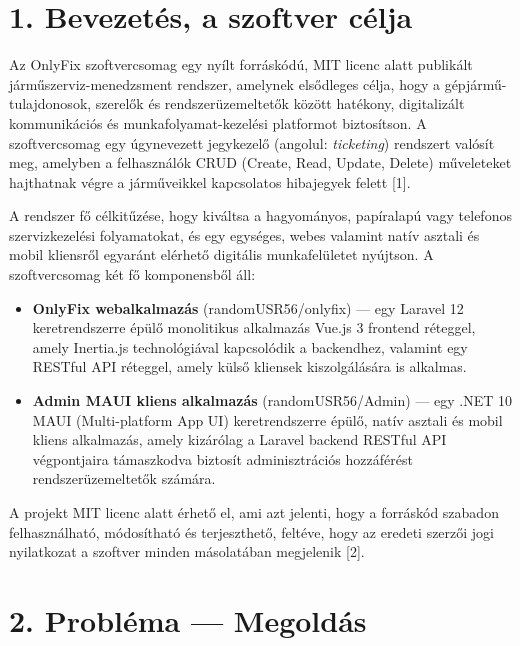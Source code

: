 \chapter{1. Bevezetés, a szoftver célja}\label{bevezetuxe9s-a-szoftver-cuxe9lja}

Az OnlyFix szoftvercsomag egy nyílt forráskódú, MIT licenc alatt publikált járműszerviz-menedzsment rendszer, amelynek elsődleges célja, hogy a gépjármű-tulajdonosok, szerelők és rendszerüzemeltetők között hatékony, digitalizált kommunikációs és munkafolyamat-kezelési platformot biztosítson. A szoftvercsomag egy úgynevezett jegykezelő (angolul: \emph{ticketing}) rendszert valósít meg, amelyben a felhasználók CRUD (Create, Read, Update, Delete) műveleteket hajthatnak végre a járműveikkel kapcsolatos hibajegyek felett {[}1{]}.

A rendszer fő célkitűzése, hogy kiváltsa a hagyományos, papíralapú vagy telefonos szervizkezelési folyamatokat, és egy egységes, webes valamint natív asztali és mobil kliensről egyaránt elérhető digitális munkafelületet nyújtson. A szoftvercsomag két fő komponensből áll:

\begin{itemize}
\item
  \textbf{OnlyFix webalkalmazás} (randomUSR56/onlyfix) --- egy Laravel 12 keretrendszerre épülő monolitikus alkalmazás Vue.js 3 frontend réteggel, amely Inertia.js technológiával kapcsolódik a backendhez, valamint egy RESTful API réteggel, amely külső kliensek kiszolgálására is alkalmas.
\item
  \textbf{Admin MAUI kliens alkalmazás} (randomUSR56/Admin) --- egy .NET 10 MAUI (Multi-platform App UI) keretrendszerre épülő, natív asztali és mobil kliens alkalmazás, amely kizárólag a Laravel backend RESTful API végpontjaira támaszkodva biztosít adminisztrációs hozzáférést rendszerüzemeltetők számára.
\end{itemize}

A projekt MIT licenc alatt érhető el, ami azt jelenti, hogy a forráskód szabadon felhasználható, módosítható és terjeszthető, feltéve, hogy az eredeti szerzői jogi nyilatkozat a szoftver minden másolatában megjelenik {[}2{]}.

\protect{}\label{_Toc223012183}{}

\chapter{2. Probléma --- Megoldás}\label{probluxe9ma-megolduxe1s}

